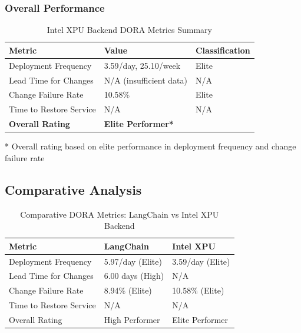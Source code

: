 \documentclass[12pt]{article}
\begin{document}
\subsubsection{Overall Performance}
\begin{table}[H]
  \centering
  \caption{Intel XPU Backend DORA Metrics Summary}
  \label{tab:intel-summary}
  \begin{tabular}{@{}lll@{}}
    \toprule
    \textbf{Metric}         & \textbf{Value}
    & \textbf{Classification} \\ \midrule
    Deployment Frequency    & 3.59/day, 25.10/week
    & Elite                   \\
    Lead Time for Changes   & N/A (insufficient data)
    & N/A                     \\
    Change Failure Rate     & 10.58\%
    & Elite                   \\
    Time to Restore Service & N/A
    & N/A                     \\ \midrule
    \textbf{Overall Rating} & \multicolumn{2}{l}{\textbf{Elite
    Performer*}}                           \\ \bottomrule
  \end{tabular}
\end{table}

* Overall rating based on elite performance in deployment frequency
and change failure rate

\subsection{Comparative Analysis}

\begin{table}[H]
  \centering
  \caption{Comparative DORA Metrics: LangChain vs Intel XPU Backend}
  \label{tab:comparison}
  \begin{tabular}{@{}lll@{}}
    \toprule
    \textbf{Metric}         & \textbf{LangChain} & \textbf{Intel XPU}
    \\ \midrule
    Deployment Frequency    & 5.97/day (Elite)   & 3.59/day (Elite)   \\
    Lead Time for Changes   & 6.00 days (High)   & N/A                \\
    Change Failure Rate     & 8.94\% (Elite)     & 10.58\% (Elite)    \\
    Time to Restore Service & N/A                & N/A                \\
    Overall Rating          & High Performer     & Elite Performer
    \\ \bottomrule
  \end{tabular}
\end{table}
\end{document}
